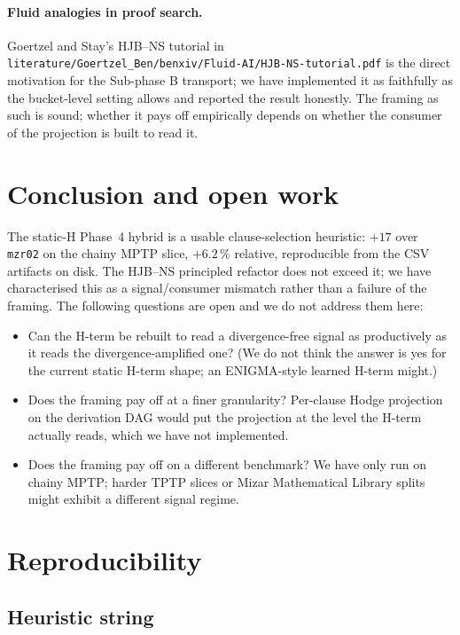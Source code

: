 \documentclass[11pt]{article}
\newcommand{\lpath}[1]{\texttt{\nolinkurl{#1}}}
\begin{document}
\paragraph{Fluid analogies in proof search.}
Goertzel and Stay's HJB--NS tutorial in
\lpath{literature/Goertzel_Ben/benxiv/Fluid-AI/HJB-NS-tutorial.pdf} is the
direct motivation for the Sub-phase B transport; we have implemented it
as faithfully as the bucket-level setting allows and reported the
result honestly. The framing as such is sound; whether it pays off
empirically depends on whether the consumer of the projection is built
to read it.

\section{Conclusion and open work}\label{sec:conclusion}

The static-H Phase~4 hybrid is a usable clause-selection heuristic:
$+17$ over \texttt{mzr02} on the chainy MPTP slice, $+6.2\,\%$
relative, reproducible from the CSV artifacts on disk. The HJB--NS
principled refactor does not exceed it; we have characterised this as
a signal/consumer mismatch rather than a failure of the framing. The
following questions are open and we do not address them here:
\begin{itemize}
\item Can the H-term be rebuilt to read a divergence-free signal as
      productively as it reads the divergence-amplified one? (We do not
      think the answer is yes for the current static H-term shape; an
      ENIGMA-style learned H-term might.)
\item Does the framing pay off at a finer granularity? Per-clause Hodge
      projection on the derivation DAG would put the projection at the
      level the H-term actually reads, which we have not implemented.
\item Does the framing pay off on a different benchmark? We have only
      run on chainy MPTP; harder TPTP slices or Mizar Mathematical
      Library splits might exhibit a different signal regime.
\end{itemize}

\section{Reproducibility}\label{sec:reproducibility}

\subsection{Heuristic string}
\end{document}
